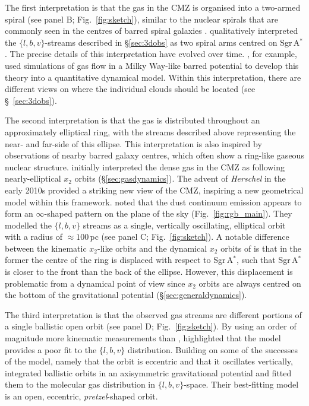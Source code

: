 The first interpretation is that the gas in the CMZ is organised into a two-armed spiral (see panel B; Fig.~\ref{fig:sketch}), similar to the nuclear spirals that are commonly seen in the centres of barred spiral galaxies \citep{Schinnerer2002, Martini2003a, Martini2003b, vandeVen2010}. \citet{Sofue1995a} qualitatively interpreted the $\{l,b,v\}$-streams described in \S\ref{sec:3dobs} as two spiral arms centred on Sgr\,A$^{*}$ \citep[see also][]{Scoville1974, Johnston2014}. 
The precise details of this interpretation have evolved over time. 
\cite{Ridley2017}, for example, used simulations of gas flow in a Milky Way-like barred potential to develop this theory into a quantitative dynamical model. 
Within this interpretation, there are different views on where the individual clouds should be located (see \S~\ref{sec:3dobs}).

The second interpretation is that the gas is distributed throughout an approximately elliptical ring, with the streams described above representing the near- and far-side of this ellipse.
This interpretation is also inspired by observations of nearby barred galaxy centres, which often show a ring-like gaseous nuclear structure. 
\citet{Binney1991} initially interpreted the dense gas in the CMZ as following nearly-elliptical $x_2$ orbits (\S\ref{sec:gasdynamics}). 
The advent of \emph{Herschel} in the early 2010s provided a striking new view of the CMZ, inspiring a new geometrical model within this framework.
\citet{Molinari2011} noted that the dust continuum emission appears to form an $\infty$-shaped pattern on the plane of the sky (Fig.~\ref{fig:rgb_main}).
They modelled the $\{l,b,v\}$ streams as a single, vertically oscillating, elliptical orbit with a radius of $\approx100$\,pc (see panel C; Fig.~\ref{fig:sketch}). 
A notable difference between the \cite{Molinari2011} kinematic $x_2$-like orbits and the dynamical $x_2$ orbits of \cite{Binney1991} is that in the former the centre of the ring is displaced with respect to Sgr\,A$^{*}$, such that Sgr\,A$^{*}$ is closer to the front than the back of the ellipse. 
However, this displacement is problematic from a dynamical point of view since $x_2$ orbits are always centred on the bottom of the gravitational potential (\S\ref{sec:generaldynamics}).

The third interpretation is that the observed gas streams are different portions of a single ballistic open orbit (see panel D; Fig.~\ref{fig:sketch}). 
By using an order of magnitude more kinematic measurements than \cite{Molinari2011}, \citet[][]{Kruijssen2015} highlighted that the \citet{Molinari2011} model provides a poor fit to the $\{l,b,v\}$ distribution.
Building on some of the successes of the \citet{Molinari2011} model, namely that the orbit is eccentric and that it oscillates vertically, \citet{Kruijssen2015} integrated ballistic orbits in an axisymmetric gravitational potential and fitted them to the molecular gas distribution in $\{l,b,v\}$-space.
Their best-fitting model is an open, eccentric, \emph{pretzel}-shaped orbit.

